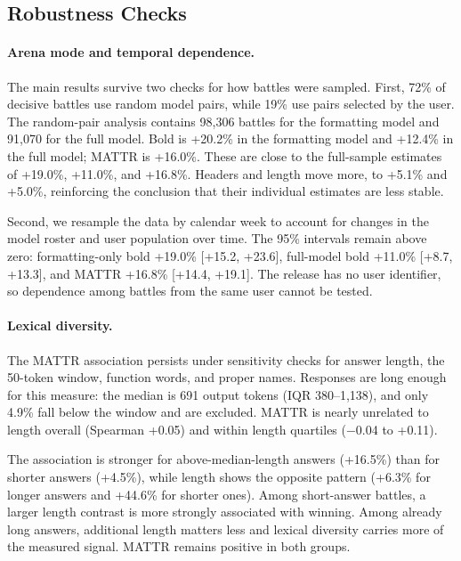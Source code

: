 \documentclass[
]{article}
\begin{document}
\subsection{Robustness Checks}\label{robustness-to-arena-mode-and-temporal-dependence}

\paragraph{Arena mode and temporal dependence.}

The main results survive two checks for how battles were sampled. First,
72\% of decisive battles use random model pairs, while 19\% use pairs
selected by the user. The random-pair analysis contains 98,306 battles
for the formatting model and 91,070 for the full model. Bold is +20.2\%
in the formatting model and +12.4\% in the full model; MATTR is +16.0\%.
These are close to the full-sample estimates of +19.0\%, +11.0\%, and
+16.8\%. Headers and length move more, to +5.1\% and +5.0\%, reinforcing
the conclusion that their individual estimates are less stable.

Second, we resample the data by calendar week to account for changes in
the model roster and user population over time. The 95\% intervals
remain above zero: formatting-only bold +19.0\% {[}+15.2, +23.6{]},
full-model bold +11.0\% {[}+8.7, +13.3{]}, and MATTR +16.8\% {[}+14.4,
+19.1{]}. The release has no user identifier, so dependence among
battles from the same user cannot be tested.

\paragraph{Lexical diversity.}\label{testing-the-lexical-diversity-result}

The MATTR association persists under sensitivity checks for answer
length, the 50-token window, function words, and proper names. Responses
are long enough for this measure: the median is 691 output tokens (IQR
380--1,138), and only 4.9\% fall below the window and are excluded.
MATTR is nearly unrelated to length overall (Spearman +0.05) and within
length quartiles (−0.04 to +0.11).

The association is stronger for above-median-length answers (+16.5\%)
than for shorter answers (+4.5\%), while length shows the opposite
pattern (+6.3\% for longer answers and +44.6\% for shorter ones). Among
short-answer battles, a larger length contrast is more strongly
associated with winning. Among already long answers, additional length
matters less and lexical diversity carries more of the measured signal.
MATTR remains positive in both groups.
\end{document}
